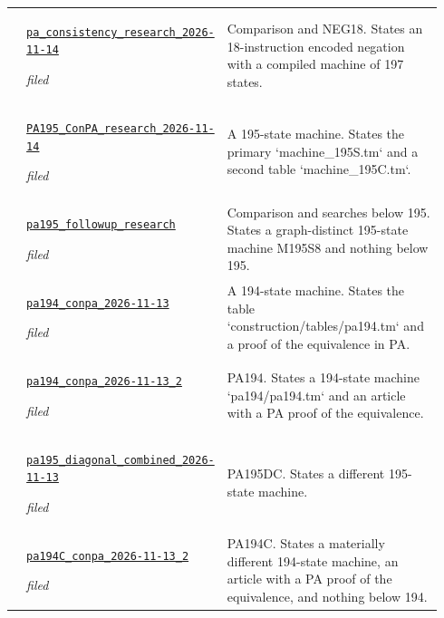 {\begin{longtable}{@{}>{\raggedright\arraybackslash}p{0.035\linewidth}>{\raggedright\arraybackslash}p{0.345\linewidth}>{\raggedright\arraybackslash}p{0.56\linewidth}@{}}
31 & \href{https://github.com/VladimirReshetnikov/ProveIt/blob/1c9524d8bf2e0a27b9a16ff622359927f536e663/Computability/BusyBeaver/Research/PA/docs/pa_consistency_research_2026-11-14/README.md}{\nolinkurl{pa_consistency_research_2026-11-14}}\par\emph{filed} & Comparison and NEG18. States an 18-instruction encoded negation with a compiled machine of 197 states.\\[4pt]
32 & \href{https://github.com/VladimirReshetnikov/ProveIt/blob/1c9524d8bf2e0a27b9a16ff622359927f536e663/Computability/BusyBeaver/Research/PA/docs/PA195_ConPA_research_2026-11-14/README.txt}{\nolinkurl{PA195_ConPA_research_2026-11-14}}\par\emph{filed} & A 195-state machine. States the primary `machine\_195S.tm` and a second table `machine\_195C.tm`.\\[4pt]
33 & \href{https://github.com/VladimirReshetnikov/ProveIt/blob/1c9524d8bf2e0a27b9a16ff622359927f536e663/Computability/BusyBeaver/Research/PA/docs/pa195_followup_research/README.md}{\nolinkurl{pa195_followup_research}}\par\emph{filed} & Comparison and searches below 195. States a graph-distinct 195-state machine M195S8 and nothing below 195.\\[4pt]
34 & \href{https://github.com/VladimirReshetnikov/ProveIt/blob/1c9524d8bf2e0a27b9a16ff622359927f536e663/Computability/BusyBeaver/Research/PA/docs/pa194_conpa_2026-11-13/README.md}{\nolinkurl{pa194_conpa_2026-11-13}}\par\emph{filed} & A 194-state machine. States the table `construction/tables/pa194.tm` and a proof of the equivalence in PA.\\[4pt]
35 & \href{https://github.com/VladimirReshetnikov/ProveIt/blob/1c9524d8bf2e0a27b9a16ff622359927f536e663/Computability/BusyBeaver/Research/PA/docs/pa194_conpa_2026-11-13_2/README.txt}{\nolinkurl{pa194_conpa_2026-11-13_2}}\par\emph{filed} & PA194. States a 194-state machine `pa194/pa194.tm` and an article with a PA proof of the equivalence.\\[4pt]
36 & \href{https://github.com/VladimirReshetnikov/ProveIt/blob/1c9524d8bf2e0a27b9a16ff622359927f536e663/Computability/BusyBeaver/Research/PA/docs/pa195_diagonal_combined_2026-11-13/README.txt}{\nolinkurl{pa195_diagonal_combined_2026-11-13}}\par\emph{filed} & PA195DC. States a different 195-state machine.\\[4pt]
37 & \href{https://github.com/VladimirReshetnikov/ProveIt/blob/1c9524d8bf2e0a27b9a16ff622359927f536e663/Computability/BusyBeaver/Research/PA/docs/pa194C_conpa_2026-11-13_2/README.md}{\nolinkurl{pa194C_conpa_2026-11-13_2}}\par\emph{filed} & PA194C. States a materially different 194-state machine, an article with a PA proof of the equivalence, and nothing below 194.\\[4pt]

\end{longtable}}
